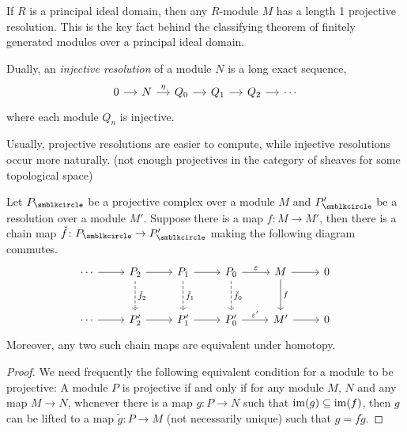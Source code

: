\begin{example}
  If $R$ is a principal ideal domain, then any $R$-module $M$ has a length 1 projective resolution. This is the key fact behind the classifying theorem of finitely generated modules over a principal ideal domain.
\end{example}

Dually, an \emph{injective resolution} of a module $N$ is a long exact sequence,
\begin{equation*}
  \begin{tikzcd}[sep=small]
    0 & N & Q_0 & Q_1 & Q_2 & \dotsb
    \arrow[from=1-1,]{1-2}[]{}
    \arrow[from=1-2,]{1-3}[]{\eta}
    \arrow[from=1-3,]{1-4}[]{}
    \arrow[from=1-4,]{1-5}[]{}
    \arrow[from=1-5,]{1-6}[]{}
  \end{tikzcd}
\end{equation*}
where each module $Q_n$ is injective.

Usually, projective resolutions are easier to compute, while injective resolutions occur more naturally. (not enough projectives in the category of sheaves for some topological space)

\begin{lemma}
  Let $P_\CCCIR$ be a projective complex over a module $M$ and $P_\CCCIR'$ be a resolution over a module $M'$. Suppose there is a map $f\colon M\to M'$, then there is a chain map $\check f\colon P_\CCCIR\to P_\CCCIR'$ making the following diagram commutes.
  \begin{equation*}
    \begin{tikzcd}[row sep=large]
      \dotsb & P_2 & P_1 & P_0 & M & 0\\
      \dotsb & P_2' & P_1' & P_0' & M' & 0
      \arrow[from=1-1,]{1-2}[]{}
      \arrow[from=1-2,]{1-3}[]{}
      \arrow[from=1-3,]{1-4}[]{}
      \arrow[from=1-4,]{1-5}[]{\varepsilon}
      \arrow[from=1-5,]{1-6}[]{}
      \arrow[from=2-1,]{2-2}[]{}
      \arrow[from=2-2,]{2-3}[]{}
      \arrow[from=2-3,]{2-4}[]{}
      \arrow[from=2-4,]{2-5}[]{\varepsilon'}
      \arrow[from=2-5,]{2-6}[]{}
      \arrow[from=1-2,dashed,]{2-2}[]{\check{f}_2}
      \arrow[from=1-3,dashed,]{2-3}[]{\check{f}_1}
      \arrow[from=1-4,dashed,]{2-4}[]{\check{f}_0}
      \arrow[from=1-5,]{2-5}[]{f}
    \end{tikzcd}
  \end{equation*}
  Moreover, any two such chain maps are equivalent under homotopy.
\end{lemma}

\begin{proof}
  We need frequently the following equivalent condition for a module to be projective: A module $P$ is projective if and only if for any module $M$, $N$ and any map $M\to N$, whenever there is a map $g\colon P\to N$ such that $\operatorname{im}(g)\subseteq\operatorname{im}(f)$, then $g$ can be lifted to a map $\tilde g\colon P\to M$ (not necessarily unique) such that $g=f\tilde g$.
\end{proof}

